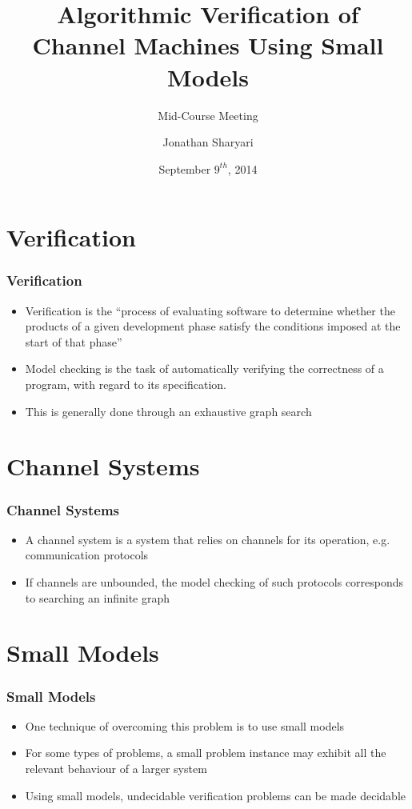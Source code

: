 \documentclass{beamer}
\title[Crisis] %
{Algorithmic Verification of Channel Machines Using Small Models}
\author[J, Sharyari | \emph{sharyari@gmail.com}] {Jonathan Sharyari}
\subtitle{Mid-Course Meeting}
\date[2014-09-09] %
{September $9^{th}$, 2014}
\institute[Dept. of Information Technology] %
{
  Department of Information Technology\\
  Uppsala University
}
\begin{document}
\begin{frame}[plain]
  \titlepage
\end{frame}
\section{Verification}
\begin{frame}
  \frametitle{Verification}
  \begin{itemize}
  \item
    Verification is the “process of evaluating software to determine whether the products of a given development phase satisfy the conditions imposed at the start of that phase”\cite{ordbok}
  \item
    Model checking is the task of automatically verifying the correctness of a program, with regard to its specification.
  \item
    This is generally done through an exhaustive graph search
  \end{itemize}
\end{frame}
\section{Channel Systems}
\begin{frame}
  \frametitle{Channel Systems}
  \begin{itemize}
  \item
    A channel system is a system that relies on channels for its operation, e.g. communication protocols
  \item
    If channels are unbounded, the model checking of such protocols corresponds to searching an infinite graph
  \end{itemize}
\end{frame}
\section{Small Models}
\begin{frame}
  \frametitle{Small Models}
  \begin{itemize}
  \item
    One technique of overcoming this problem is to use small models
  \item
    For some types of problems, a small problem instance may exhibit all the relevant behaviour of a larger system
  \item
    Using small models, undecidable verification problems can be made decidable
  \end{itemize}
\end{frame}
\end{document}
